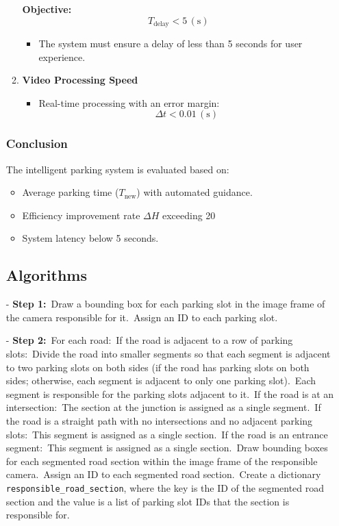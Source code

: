 \documentclass{article}
\newcommand{\tab}{\hspace*{2em}}
\begin{document}
\begin{itemize}[label=-]
\begin{enumerate}
\textbf{Objective:} \[T_\text{delay} < 5 \, (\text{s})\]
    \begin{itemize}
    \item The system must ensure a delay of less than 5 seconds for user experience.
    \end{itemize}

    \item \textbf{Video Processing Speed}
    \begin{itemize}
        \item Real-time processing with an error margin:
    \[
    \Delta t < 0.01 \, (\text{s})
    \]
    \end{itemize}
\end{enumerate}

\subsubsection{Conclusion}
The intelligent parking system is evaluated based on:
    \begin{itemize}[label=-]
        \item Average parking time ($T_\text{new}$) with automated guidance.
        \item Efficiency improvement rate $\Delta{H}$ exceeding 20%
    \item System latency below 5 seconds.
    \end{itemize}

\subsection{Algorithms}
\noindent - \textbf{Step 1:}\
Draw a bounding box for each parking slot in the image frame of the camera responsible for it.\
Assign an ID to each parking slot.\

\noindent - \textbf{Step 2:}\
For each road:\
\tab If the road is adjacent to a row of parking slots:\
\tab \tab Divide the road into smaller segments so that each segment is adjacent to two parking slots on both sides (if the road has parking slots on both sides; otherwise, each segment is adjacent to only one parking slot).\
\tab \tab Each segment is responsible for the parking slots adjacent to it.\
\tab If the road is at an intersection:\
\tab \tab The section at the junction is assigned as a single segment.\
\tab If the road is a straight path with no intersections and no adjacent parking slots:\
\tab \tab This segment is assigned as a single section.\
\tab If the road is an entrance segment:\
\tab \tab This segment is assigned as a single section.\
\tab Draw bounding boxes for each segmented road section within the image frame of the responsible camera.\
\tab Assign an ID to each segmented road section.\
\tab Create a dictionary \texttt{responsible\_road\_section}, where the key is the ID of the segmented road section and the value is a list of parking slot IDs that the section is responsible for.\


\end{itemize}
\end{document}
